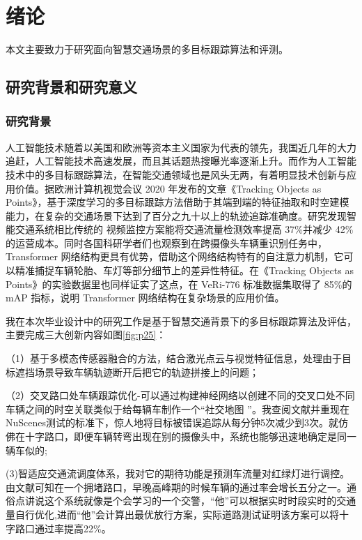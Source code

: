 \chapter{绪论}

本文主要致力于研究面向智慧交通场景的多目标跟踪算法和评测。

\section{研究背景和研究意义}

\subsection{研究背景}

人工智能技术随着以美国和欧洲等资本主义国家为代表的领先，我国近几年的大力追赶，人工智能技术高速发展，而且其话题热搜曝光率逐渐上升。而作为人工智能技术中的多目标跟踪算法，在智能交通领域也是风头无两，有着明显技术创新与应用价值。据欧洲计算机视觉会议 2020 年发布的文章《Tracking Objects as Points》，基于深度学习的多目标跟踪方法借助于其端到端的特征抽取和时空建模能力，在复杂的交通场景下达到了百分之九十以上的轨迹追踪准确度\cite{zhou2020tracking}。研究发现智能交通系统相比传统的 视频监控方案能将交通流量检测效率提高 37\%并减少 42\%的运营成本\cite{wang2023cost}。同时各国科研学者们也观察到在跨摄像头车辆重识别任务中，Transformer 网络结构更具有优势，借助这个网络结构特有的自注意力机制，它可以精准捕捉车辆轮胎、车灯等部分细节上的差异性特征。在《Tracking Objects as Points》的实验数据里也同样证实了这点，在 VeRi-776 标准数据集取得了 85\%的 mAP 指标\cite{chen2022vehicle}，说明 Transformer 网络结构在复杂场景的应用价值。

我在本次毕业设计中的研究工作是基于智慧交通背景下的多目标跟踪算法及评估，主要完成三大创新内容如图\ref{fig:p25}：

（1）基于多模态传感器融合的方法，结合激光点云与视觉特征信息，处理由于目标遮挡场景导致车辆轨迹断开后把它的轨迹拼接上的问题\cite{liu2021multi}；

（2）交叉路口处车辆跟踪优化-可以通过构建神经网络以创建不同的交叉口处不同车辆之间的时空关联类似于给每辆车制作一个“社交地图 ”。我查阅文献并重现在NuScenes测试的标准下，惊人地将目标被错误追踪从每分钟5次减少到3次。就仿佛在十字路口，即便车辆转弯出现在别的摄像头中，系统也能够迅速地确定是同一辆车似的\cite{yuan2023graph};

(3)智适应交通流调度体系，我对它的期待功能是预测车流量对红绿灯进行调控。由文献\cite{zhang2024meta}可知在一个拥堵路口，早晚高峰期的时候车辆的通过率会增长五分之一。通俗点讲说这个系统就像是个会学习的一个交警，“他”可以根据实时时段实时的交通量自行优化,进而“他”会计算出最优放行方案，实际道路测试证明该方案可以将十字路口通过率提高22\%。

